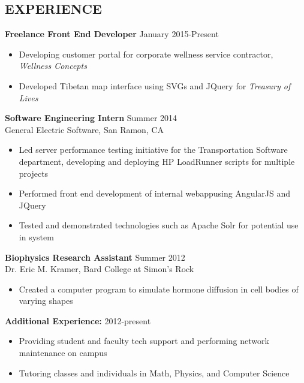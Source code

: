 \documentclass{res}
\begin{document}
\begin{resume}
\section{EXPERIENCE} 
{\bf Freelance Front End Developer} \hfill January 2015-Present
\begin{itemize}
\item Developing customer portal for corporate wellness service contractor, \textit{Wellness Concepts}
\item Developed Tibetan map interface using SVGs and JQuery for \textit{Treasury of Lives}
\end{itemize}
\vspace*{-\baselineskip}\leavevmode
{\bf Software Engineering Intern} \hfill Summer 2014\\
General Electric Software, San Ramon, CA
\begin{itemize}
\item Led server performance testing initiative for the Transportation Software department, developing and deploying HP LoadRunner scripts for multiple projects
\item Performed front end development of internal webappusing AngularJS and JQuery
\item Tested and demonstrated technologies such as Apache Solr for potential use in system
\end{itemize}
\vspace*{-\baselineskip}\leavevmode
{\bf Biophysics Research Assistant} \hfill Summer 2012\\
Dr. Eric M. Kramer, Bard College at Simon's Rock
\begin{itemize}
\item Created a computer program to simulate hormone diffusion in cell bodies of varying shapes
\end{itemize}
\vspace*{-\baselineskip}\leavevmode
{\bf Additional Experience:} \hfill 2012-present
\begin{itemize}
\item Providing student and faculty tech support and performing network maintenance on campus
\item Tutoring classes and individuals in Math, Physics, and Computer Science
\end{itemize}
 

\end{resume}
\end{document}
